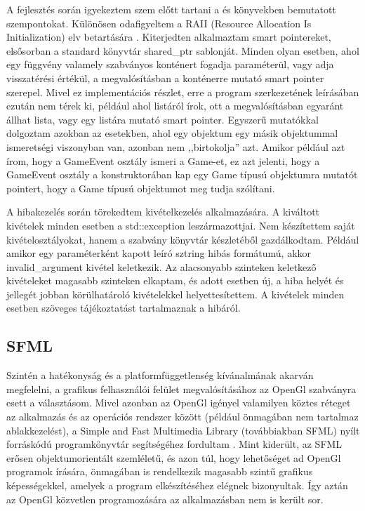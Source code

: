 \documentclass[12pt, twoside]{report}
\begin{document}
A fejlesztés során igyekeztem szem előtt tartani a \cite{codingrules} és \cite{effective} könyvekben bemutatott szempontokat. Különösen odafigyeltem a RAII (Resource Allocation Is Initialization) elv betartására \cite{raii}. Kiterjedten alkalmaztam smart pointereket, elsősorban a standard könyvtár shared\_ptr sablonját. Minden olyan esetben, ahol egy függvény valamely szabványos konténert fogadja paraméterül, vagy adja visszatérési értékül, a megvalósításban a konténerre mutató smart pointer szerepel. Mivel ez implementációs részlet, erre a program szerkezetének leírásában ezután nem térek ki, például ahol listáról írok, ott a megvalósításban egyaránt állhat lista, vagy egy listára mutató smart pointer. Egyszerű mutatókkal dolgoztam azokban az esetekben, ahol egy objektum egy másik objektummal ismeretségi viszonyban van, azonban nem ,,birtokolja'' azt. Amikor például azt írom, hogy a GameEvent osztály ismeri a Game-et, ez azt jelenti, hogy a GameEvent osztály a konstruktorában kap egy Game típusú objektumra mutatót pointert, hogy a Game típusú objektumot meg tudja szólítani.

A hibakezelés során törekedtem kivételkezelés alkalmazására. A kiváltott kivételek minden esetben a std::exception leszármazottjai. Nem készítettem saját kivételosztályokat, hanem a szabvány könyvtár készletéből gazdálkodtam. Például amikor egy paraméterként kapott leíró sztring hibás formátumú, akkor invalid\_argument kivétel keletkezik. Az alacsonyabb szinteken keletkező kivételeket magasabb szinteken elkaptam, és adott esetben új, a hiba helyét és jellegét jobban körülhatároló kivételekkel helyettesítettem. A kivételek minden esetben szöveges tájékoztatást tartalmaznak a hibáról.

\subsection{SFML}

Szintén a hatékonyság és a platformfüggetlenség kívánalmának akarván megfelelni, a grafikus felhasználói felület megvalósításához az OpenGl szabványra esett a választásom. Mivel azonban az OpenGl igényel valamilyen köztes réteget az alkalmazás és az operációs rendszer között (például önmagában nem tartalmaz ablakkezelést), a Simple and Fast Multimedia Library (továbbiakban SFML) nyílt forráskódú programkönyvtár se\-gít\-sé\-gé\-hez fordultam \cite{sfml}. Mint kiderült, az SFML erősen objektumorientált szemléletű, és azon túl, hogy lehetőséget ad OpenGl programok írására, önmagában is rendelkezik magasabb szintű grafikus képességekkel, amelyek a program elkészítéséhez elégnek bizonyultak. Így aztán az OpenGl közvetlen programozására az alkalmazásban nem is került sor. 
\end{document}
